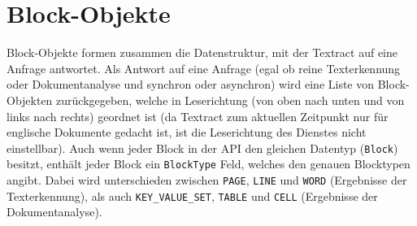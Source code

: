 \documentclass{whswinvcbook}
\begin{document}
\section{Block-Objekte}
Block-Objekte formen zusammen die Datenstruktur, mit der Textract auf eine Anfrage antwortet. Als Antwort auf eine Anfrage (egal ob reine Texterkennung oder Dokumentanalyse und synchron oder asynchron) wird eine Liste von Block-Objekten zurückgegeben, welche in Leserichtung (von oben nach unten und von links nach rechts) geordnet ist (da Textract zum aktuellen Zeitpunkt nur für englische Dokumente gedacht ist, ist die Leserichtung des Dienstes nicht einstellbar). Auch wenn jeder Block in der API den gleichen Datentyp (\texttt{Block}) besitzt, enthält jeder Block ein \texttt{BlockType} Feld, welches den genauen Blocktypen angibt. Dabei wird unterschieden zwischen \texttt{PAGE}, \texttt{LINE} und \texttt{WORD} (Ergebnisse der Texterkennung), als auch \texttt{KEY\_VALUE\_SET}, \texttt{TABLE} und \texttt{CELL} (Ergebnisse der Dokumentanalyse).
\end{document}
